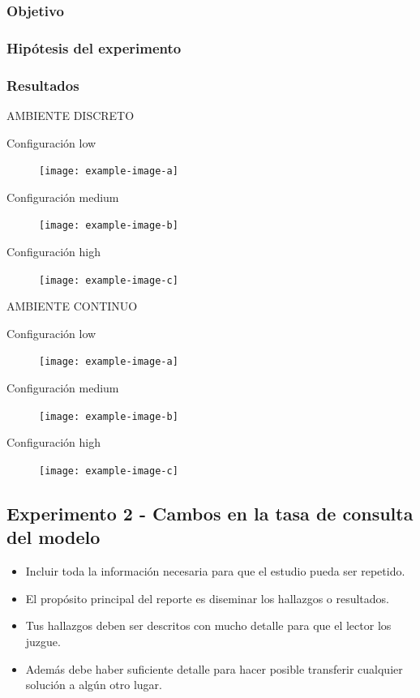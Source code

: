 \subsubsection{Objetivo}
\subsubsection{Hipótesis del experimento}
\subsubsection{Resultados}

AMBIENTE DISCRETO

Configuración low
\begin{figure}[H]
    \centering
    \texttt{[image: example-image-a]}
\end{figure}


Configuración medium
\begin{figure}[H]
    \centering
    \texttt{[image: example-image-b]}
\end{figure}

Configuración high
\begin{figure}[H]
    \centering
    \texttt{[image: example-image-c]}
\end{figure}



AMBIENTE CONTINUO

Configuración low
\begin{figure}[H]
    \centering
    \texttt{[image: example-image-a]}
\end{figure}


Configuración medium
\begin{figure}[H]
    \centering
    \texttt{[image: example-image-b]}
\end{figure}

Configuración high
\begin{figure}[H]
    \centering
    \texttt{[image: example-image-c]}
\end{figure}


\subsection{Experimento 2 - Cambos en la tasa de consulta del modelo}



\begin{itemize}

    \item Incluir toda la información necesaria para que el estudio
    pueda ser repetido.
    \item El propósito principal del reporte es diseminar los hallazgos o resultados.
    \item Tus hallazgos deben ser descritos con mucho detalle para que el lector los juzgue.
    \item Además debe haber suficiente detalle para hacer posible
    transferir cualquier solución a algún otro lugar.
\end{itemize}    


